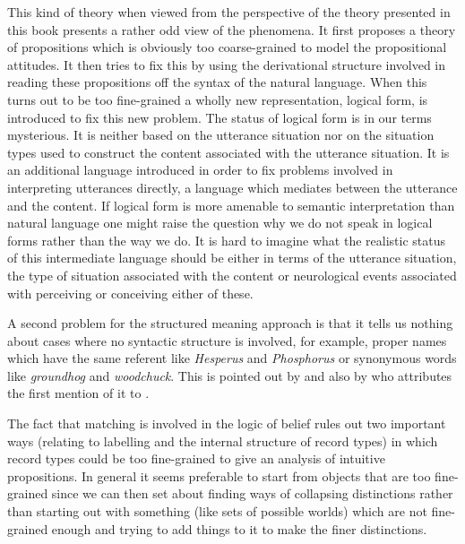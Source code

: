 This kind of theory when viewed from the
perspective of the theory presented in this book presents a rather odd
view of the phenomena.  It first proposes a theory of propositions
which is obviously too coarse-grained to model the
propositional attitudes.  It then tries to fix this by using the
derivational structure involved in reading these propositions off the
syntax of the natural language.  When this turns out to be too fine-grained a wholly new representation, logical form, is introduced to fix this new
problem.  The status of logical form is in our terms mysterious.  It
is neither based on the utterance situation nor on the situation types
used to construct the content associated with the utterance
situation.  It is an additional language introduced in
order to fix problems involved in interpreting utterances directly,
a language which mediates between the utterance and the content.  If
logical form is more amenable to semantic interpretation than natural
language one might raise the question why we do not speak in logical
forms rather than the way we do.
It is hard to imagine what the realistic status of this intermediate language
should be either in terms of the utterance situation, the type of
situation associated with the content or neurological events
associated with perceiving or conceiving either of these.  



A second problem for the structured meaning approach is that it tells
us nothing about cases where no syntactic structure is involved, for
example, proper names which have the same referent like
\textit{Hesperus} and \textit{Phosphorus} or synonymous words like
\textit{groundhog} and \textit{woodchuck}.  This is pointed out by
\cite{DowtyWallPeters1981} and also by \cite{Egre2020} who attributes
the first mention of it to \cite{Mates1952}.

   

The fact that matching is involved in the logic of belief rules out two
important ways (relating to labelling and the internal structure of
record types) in which record types could be too fine-grained to give
an analysis of intuitive propositions.  In general it seems preferable to
start from objects that are too fine-grained since we can then set
about finding ways of collapsing distinctions rather than starting out
with something (like sets of possible worlds) which are not
fine-grained enough and trying to add things to it to make the finer
distinctions.  

